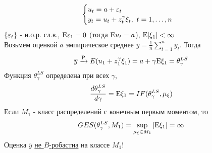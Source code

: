 \begin{example}
    \[\begin{cases}
        u_t = a + \varepsilon_t \\
        y_t = u_t + z^\gamma_t\xi_t, \ t=1,\ldots,n
    \end{cases}\]
    $\{\varepsilon_t\}$ - н.о.р. сл.в., $\mathrm{E}\varepsilon_1=0$ (тогда $\mathrm{E} u_t=a$), $\mathrm{E}\vert\xi_1\vert<\infty$ \\
    Возьмем оценкой $a$ эмпирическое среднее $\overline{y}=\frac{1}{n}\sum_{t=1}^ny_t$.
    Тогда 
    \[\overline{y}\xrightarrow{\mathrm{P}}E(u_1+z_1^\gamma\xi_1)=a+\gamma\mathrm{E}\xi_1=\theta^{LS}_\gamma\]
    Функция $\theta_\gamma^{LS}$ определена при всех $\gamma$,
    \[\frac{d\theta_\gamma^{LS}}{d\gamma}=\mathrm{E}\xi_1=IF(\theta_\gamma^{LS}, \mu_\xi)\]
    Если $M_1$ - класс распределений с конечным первым моментом, то
    \[GES(\theta_\gamma^{LS}, M_1) = \sup_{\mu_\xi\in M_1} \vert\mathrm{E}\xi_1\vert = \infty\]
    Оценка $\overline{y}$ \underline{не $B$-робастна} на  классе $M_1$!
\end{example}
